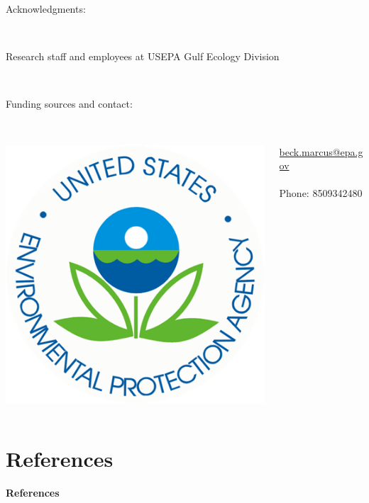 \documentclass[serif]{beamer}\usepackage[]{graphicx}\usepackage[]{color}
\begin{document}
\begin{frame}
Acknowledgments:\\~\\
\begin{columns}
\begin{column}{0.8\textwidth}
{\footnotesize
Research staff and employees at USEPA Gulf Ecology Division \\~\\
}
\end{column}
\begin{column}{0.2\textwidth}
\end{column}
\end{columns}
\vfill
Funding sources and contact:\\~\\
\begin{columns}
\begin{column}{0.5\textwidth}
\centerline{\includegraphics[width=0.4\linewidth]{fig/epa_logo.png}}
\end{column}
\begin{column}{0.5\textwidth}
\scriptsize
\href{mailto:beck.marcus@epa.gov}{beck.marcus@epa.gov} \\~\\
Phone: 8509342480
\end{column}
\end{columns}
\vspace{0.2in}
\end{frame}

\section{References}
\begin{frame}[t]{\textbf{References}}
\tiny
{}


\end{frame}
\end{document}
